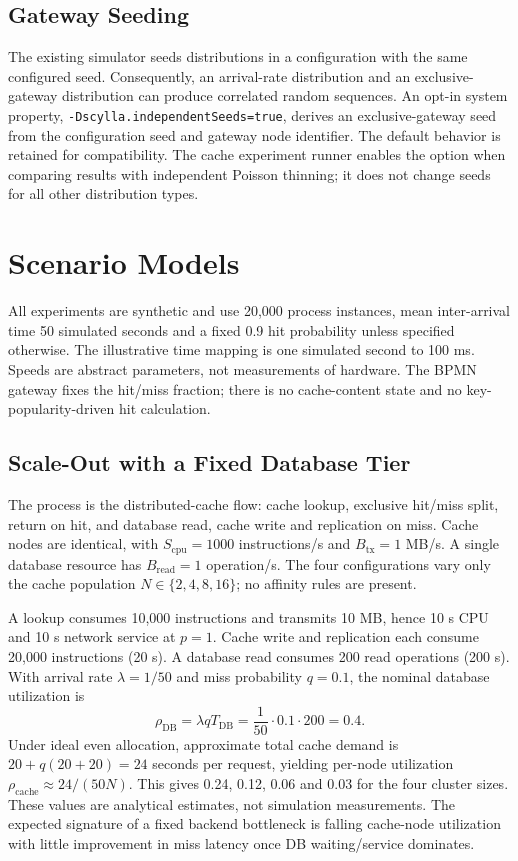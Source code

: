 \documentclass[conference]{IEEEtran}
\begin{document}
\subsection{Gateway Seeding}

The existing simulator seeds distributions in a configuration with the same configured seed. Consequently, an
arrival-rate distribution and an exclusive-gateway distribution can produce correlated random sequences. An opt-in
system property, \texttt{-Dscylla.independentSeeds=true}, derives an exclusive-gateway seed from the configuration
seed and gateway node identifier. The default behavior is retained for compatibility. The cache experiment runner
enables the option when comparing results with independent Poisson thinning; it does not change seeds for all other
distribution types.

\section{Scenario Models}

All experiments are synthetic and use 20,000 process instances, mean inter-arrival time 50 simulated seconds and a
fixed 0.9 hit probability unless specified otherwise. The illustrative time mapping is one simulated second to
100 ms. Speeds are abstract parameters, not measurements of hardware. The BPMN gateway fixes the hit/miss fraction;
there is no cache-content state and no key-popularity-driven hit calculation.

\subsection{Scale-Out with a Fixed Database Tier}

The process is the distributed-cache flow: cache lookup, exclusive hit/miss split, return on hit, and database read,
cache write and replication on miss. Cache nodes are identical, with $S_{\mathrm{cpu}}=1000$ instructions/s and
$B_{\mathrm{tx}}=1$ MB/s. A single database resource has $B_{\mathrm{read}}=1$ operation/s. The four configurations
vary only the cache population $N\in\{2,4,8,16\}$; no affinity rules are present.

A lookup consumes 10,000 instructions and transmits 10 MB, hence 10 s CPU and 10 s network service at $p=1$. Cache
write and replication each consume 20,000 instructions (20 s). A database read consumes 200 read operations (200 s).
With arrival rate $\lambda=1/50$ and miss probability $q=0.1$, the nominal database utilization is
\begin{equation}
\rho_{\mathrm{DB}}=\lambda q T_{\mathrm{DB}}=\frac{1}{50}\cdot 0.1\cdot 200=0.4.
\end{equation}
Under ideal even allocation, approximate total cache demand is $20+q(20+20)=24$ seconds per request, yielding
per-node utilization $\rho_{\mathrm{cache}}\approx24/(50N)$. This gives 0.24, 0.12, 0.06 and 0.03 for the four
cluster sizes. These values are analytical estimates, not simulation measurements. The expected signature of a fixed
backend bottleneck is falling cache-node utilization with little improvement in miss latency once DB waiting/service
dominates.
\end{document}
